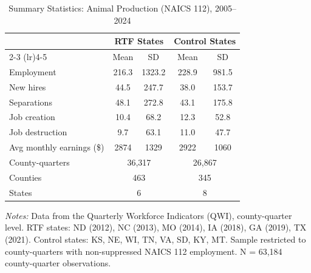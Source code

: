 \begin{table}[H]
\centering
\caption{Summary Statistics: Animal Production (NAICS 112), 2005--2024}
\label{tab:summary}
\begin{threeparttable}
\begin{tabular}{lcccc}
\toprule
 & \multicolumn{2}{c}{RTF States} & \multicolumn{2}{c}{Control States} \\
\cmidrule(lr){2-3} \cmidrule(lr){4-5}
 & Mean & SD & Mean & SD \\
\midrule
Employment & 216.3 & 1323.2 & 228.9 & 981.5 \\
New hires & 44.5 & 247.7 & 38.0 & 153.7 \\
Separations & 48.1 & 272.8 & 43.1 & 175.8 \\
Job creation & 10.4 & 68.2 & 12.3 & 52.8 \\
Job destruction & 9.7 & 63.1 & 11.0 & 47.7 \\
Avg monthly earnings (\$) & 2874 & 1329 & 2922 & 1060 \\
\midrule
County-quarters & \multicolumn{2}{c}{36,317} & \multicolumn{2}{c}{26,867} \\
Counties & \multicolumn{2}{c}{463} & \multicolumn{2}{c}{345} \\
States & \multicolumn{2}{c}{6} & \multicolumn{2}{c}{8} \\
\bottomrule
\end{tabular}
\begin{tablenotes}[flushleft]
\small
\item \textit{Notes:} Data from the Quarterly Workforce Indicators (QWI), county-quarter level. RTF states: ND (2012), NC (2013), MO (2014), IA (2018), GA (2019), TX (2021). Control states: KS, NE, WI, TN, VA, SD, KY, MT. Sample restricted to county-quarters with non-suppressed NAICS 112 employment. N = 63,184 county-quarter observations.
\end{tablenotes}
\end{threeparttable}
\end{table}

